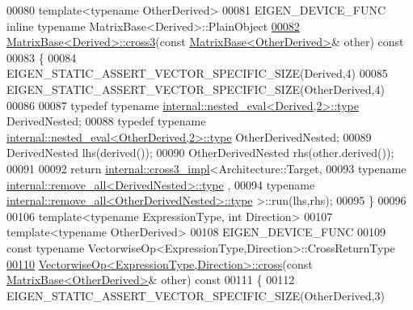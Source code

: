 \begin{DoxyCode}
00080 \textcolor{keyword}{template}<\textcolor{keyword}{typename} OtherDerived>
00081 EIGEN\_DEVICE\_FUNC \textcolor{keyword}{inline} \textcolor{keyword}{typename} MatrixBase<Derived>::PlainObject
\hyperlink{group___geometry___module_gaf10988c8393785423ae68a5afdf83226}{00082} \hyperlink{group___geometry___module_gaf10988c8393785423ae68a5afdf83226}{MatrixBase<Derived>::cross3}(\textcolor{keyword}{const} 
      \hyperlink{group___core___module_class_eigen_1_1_matrix_base}{MatrixBase<OtherDerived>}& other)\textcolor{keyword}{ const}
00083 \textcolor{keyword}{}\{
00084   EIGEN\_STATIC\_ASSERT\_VECTOR\_SPECIFIC\_SIZE(Derived,4)
00085   EIGEN\_STATIC\_ASSERT\_VECTOR\_SPECIFIC\_SIZE(OtherDerived,4)
00086 
00087   \textcolor{keyword}{typedef} \textcolor{keyword}{typename} \hyperlink{class_eigen_1_1internal_1_1_tensor_lazy_evaluator_writable}{internal::nested\_eval<Derived,2>::type} 
      DerivedNested;
00088   \textcolor{keyword}{typedef} \textcolor{keyword}{typename} \hyperlink{class_eigen_1_1internal_1_1_tensor_lazy_evaluator_writable}{internal::nested\_eval<OtherDerived,2>::type} 
      OtherDerivedNested;
00089   DerivedNested lhs(derived());
00090   OtherDerivedNested rhs(other.derived());
00091 
00092   \textcolor{keywordflow}{return} \hyperlink{struct_eigen_1_1internal_1_1cross3__impl}{internal::cross3\_impl}<Architecture::Target,
00093                         \textcolor{keyword}{typename} \hyperlink{group___sparse_core___module}{internal::remove\_all<DerivedNested>::type}
      ,
00094                         \textcolor{keyword}{typename} \hyperlink{group___sparse_core___module}{internal::remove\_all<OtherDerivedNested>::type}
      >::run(lhs,rhs);
00095 \}
00096 
00106 \textcolor{keyword}{template}<\textcolor{keyword}{typename} ExpressionType, \textcolor{keywordtype}{int} Direction>
00107 \textcolor{keyword}{template}<\textcolor{keyword}{typename} OtherDerived>
00108 EIGEN\_DEVICE\_FUNC 
00109 \textcolor{keyword}{const} \textcolor{keyword}{typename} VectorwiseOp<ExpressionType,Direction>::CrossReturnType
\hyperlink{group___geometry___module_gab3efae0c028a63a41cccb94d978d1437}{00110} \hyperlink{group___geometry___module_gab3efae0c028a63a41cccb94d978d1437}{VectorwiseOp<ExpressionType,Direction>::cross}(\textcolor{keyword}{const} 
      \hyperlink{group___core___module_class_eigen_1_1_matrix_base}{MatrixBase<OtherDerived>}& other)\textcolor{keyword}{ const}
00111 \textcolor{keyword}{}\{
00112   EIGEN\_STATIC\_ASSERT\_VECTOR\_SPECIFIC\_SIZE(OtherDerived,3)

\end{DoxyCode}
